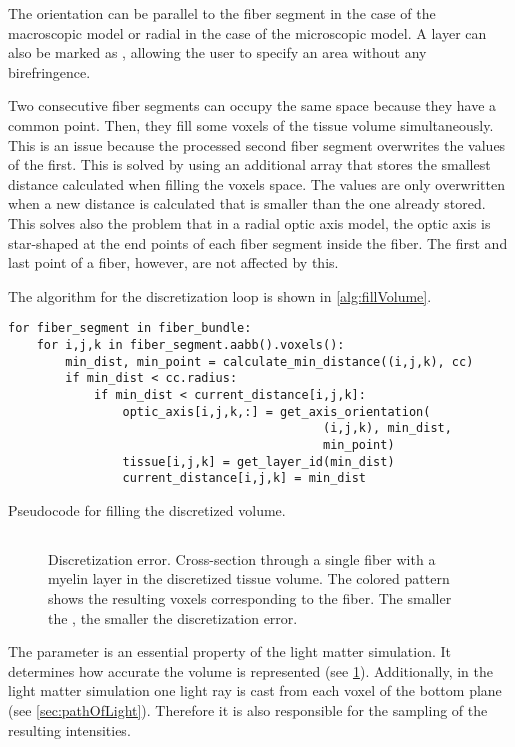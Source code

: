 The orientation can be parallel to the fiber segment in the case of the macroscopic model or radial in the case of the microscopic model.
A layer can also be marked as , allowing the user to specify an area without any birefringence.
\par
%
Two consecutive fiber segments can occupy the same space because they have a common point.
Then, they fill some voxels of the tissue volume simultaneously.
This is an issue because the processed second fiber segment overwrites the values of the first.
This is solved by using an additional array that stores the smallest distance calculated when filling the voxels space.
The values are only overwritten when a new distance is calculated that is smaller than the one already stored.
This solves also the problem that in a radial optic axis model, the optic axis is star-shaped at the end points of each fiber segment inside the fiber.
The first and last point of a fiber, however, are not affected by this.
\par
%
The algorithm for the discretization loop is shown in \cref{alg:fillVolume}.
%
\begin{lstfloat}[!tb]
\lstset{style=python}
\begin{lstlisting}[]
for fiber_segment in fiber_bundle:
    for i,j,k in fiber_segment.aabb().voxels():
        min_dist, min_point = calculate_min_distance((i,j,k), cc)
        if min_dist < cc.radius:
            if min_dist < current_distance[i,j,k]:
                optic_axis[i,j,k,:] = get_axis_orientation(
                                            (i,j,k), min_dist,
                                            min_point)
                tissue[i,j,k] = get_layer_id(min_dist)
                current_distance[i,j,k] = min_dist
\end{lstlisting}
\caption{Pseudocode for filling the discretized volume.}
\label{alg:fillVolume}
\end{lstfloat}
%
%
%
\subsection{\Voxelsize}
%
\begin{figure}[!t]
\centering
\setlength{\tikzwidth}{.24\textwidth}

\caption{Discretization error. Cross-section through a single fiber with a myelin layer in the discretized tissue volume. The colored pattern shows the resulting voxels corresponding to the fiber. The smaller the \Voxelsize, the smaller the discretization error.}
\label{fig:vectorfield_disc_error}
\end{figure}
%
The parameter \Voxelsize{} is an essential property of the light matter simulation.
It determines how accurate the volume is represented (see \cref{fig:vectorfield_disc_error}).
Additionally, in the light matter simulation one light ray is cast from each voxel of the bottom plane (see \cref{sec:pathOfLight}). 
Therefore it is also responsible for the sampling of the resulting intensities.
%
%
% 

